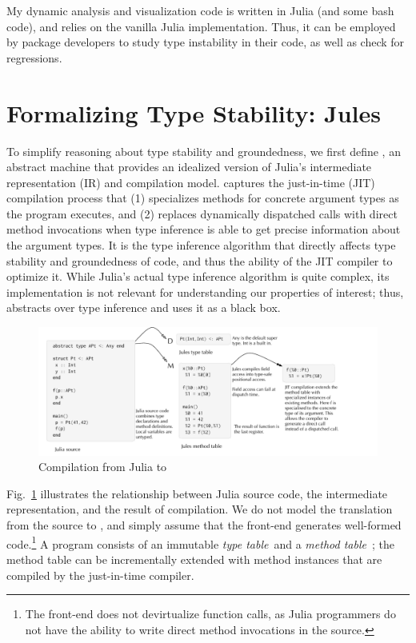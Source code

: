 \documentclass[oneside,openright,titlepage,numbers=noenddot,%
headinclude,footinclude,cleardoublepage=empty,abstract=on,
BCOR=5mm,paper=a4,fontsize=11pt,
dvipsnames
]{scrreprt}
\begin{document}
My dynamic analysis and visualization code is written in Julia (and some bash
code), and relies on the vanilla Julia implementation. Thus, it can be employed
by package developers to study type instability in their code, as well as check
for regressions.


\section{Formalizing Type Stability: Jules}%
\label{sec:jules}


To simplify reasoning about type stability and groundedness, we first
define \jules, an abstract machine that provides an idealized version of
Julia's intermediate representation (IR) and compilation model.
\jules captures the just-in-time (JIT) compilation process that (1) specializes methods
for concrete argument types as the program executes, and (2) replaces dynamically
dispatched calls with direct method invocations when type inference
is able to get precise information about the argument types.
It is the type inference algorithm that directly affects
type stability and groundedness of code, and thus the ability of the JIT compiler
to optimize it. While Julia's actual type inference algorithm
is quite complex, its implementation is not relevant for understanding
our properties of interest; thus, \jules abstracts over type inference
and uses it as a black box.

\begin{figure}[!h]
  \includegraphics[width=1.1\columnwidth]{figs/compile.pdf}
  \caption{Compilation from Julia to \jules}\label{comp}
\end{figure}

Fig.~\ref{comp} illustrates the relationship between Julia source code, the
\jules intermediate representation, and the result of compilation. We do not model
the translation from the source to \jules, and simply assume that the front-end
generates well-formed \jules code.\footnote{The front-end does not devirtualize
function calls, as Julia programmers do not have the ability to write direct
method invocations in the source.} A \jules program consists of an immutable \emph{type
table}~\tytbl and a \emph{method table}~\mtbl; the method table can be incrementally extended
with method instances that are compiled by the just-in-time compiler.
\end{document}
